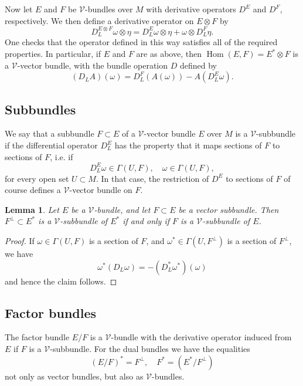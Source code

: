 \documentclass[11pt]{amsart}
\DeclareMathOperator{\Hom}{Hom}
\theoremstyle{definition}
\theoremstyle{remark}
\theoremstyle{plain}
\newtheorem{lem}[defn]{Lemma}
\begin{document}
Now let $E$ and $F$ be $\mathcal{V}$-bundles over $M$ with derivative operators $D^E$ and $D^F$, 
respectively. We then define a derivative operator on $E \otimes F$  by
\[ D_L^{E\otimes F} \omega\otimes \eta = D_L^E \omega \otimes \eta + \omega \otimes D_L^F \eta.   \]
One checks that the operator defined in this way satisfies all of the required properties.
In particular, if $E$ and $F$ are as above, then $\Hom (E,F)= E^* \otimes F $ is a $\mathcal{V}$-vector 
bundle, with the bundle operation $D$ defined by 
\[ (D_{L} A) (\omega) = D^F_{L} (A(\omega)) - A (D^E_{L} \omega).   \]

%
%
\subsection{Subbundles} %
\label{sub:subbundles}
%
%
We say that  a subbundle $F \subset E$ of a $\mathcal{V}$-vector bundle 
$E$ over $M$ is a $\mathcal{V}$-subbundle if the differential operator 
$D^E_{L}$ has the property that it maps sections of 
$F$ to sections of $F$, i.e. if 
%
\[ D^E_{ L} \omega \in \Gamma (U,F), \quad \omega \in \Gamma (U,F), \]
%
for every open set $U\subset M$.
In that case, the restriction of $D^E$ to sections of $F$ of 
course defines a $\mathcal{V}$-vector bundle on $F$. 

\begin{lem}\label{lem:perp} Let $E$ be a $\mathcal{V}$-bundle, and
	let $F\subset E$ be a vector subbundle. Then $F^\perp \subset E^*$ 
	is a $\mathcal{V}$-subbundle of $E^*$ if and only if $F$ is a $\mathcal{V}$-subbundle
	of $E$. 
\end{lem}

\begin{proof}
	If $\omega\in \Gamma(U,F)$
	is a section of $F$, 
	and $\omega^*\in \Gamma(U,F^\perp)$ is a section of $F^\perp$,
	we have 
	\[ \omega^* (D_{L} \omega ) =  - (D_{L}^* \omega^* ) (\omega) \]
	and hence  the claim follows.
\end{proof}

%
%
\subsection{Factor bundles}
%
%
The factor bundle $E/F$ is a $\mathcal{V}$-bundle with the derivative operator
induced from $E$ if $F$ is a $\mathcal{V}$-subbundle. For the dual bundles we have
the equalities 
\[ \left( E/F \right)^* = F^\perp, 
\quad F^*  = \left( E^* / F^\perp \right) \]
not only as vector bundles, but also as $\mathcal{V}$-bundles. 
\end{document}
